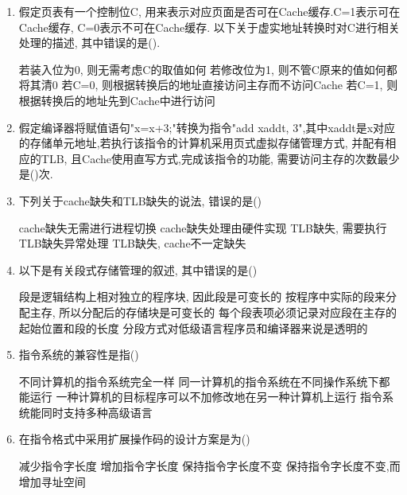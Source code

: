 \documentclass[12pt, a4paper, oneside, UTF8]{ctexbook}
\begin{document}
\begin{enumerate}
    \item 假定页表有一个控制位C, 用来表示对应页面是否可在Cache缓存.C=1表示可在Cache缓存, C=0表示不可在Cache缓存.
    以下关于虚实地址转换时对C进行相关处理的描述, 其中错误的是(\qquad).
    \begin{choices}[1]
        \task 若装入位为0, 则无需考虑C的取值如何
        \task 若修改位为1, 则不管C原来的值如何都将其清0
        \task 若C=0, 则根据转换后的地址直接访问主存而不访问Cache
        \task 若C=1, 则根据转换后的地址先到Cache中进行访问
    \end{choices}

    \item 假定编译器将赋值语句"x=x+3;"转换为指令"add xaddt, 3",其中xaddt是x对应的存储单元地址,若执行该指令的计算机采用页式虚拟存储管理方式,
    并配有相应的TLB, 且Cache使用直写方式,完成该指令的功能, 需要访问主存的次数最少是(\qquad)次.

    \item 下列关于cache缺失和TLB缺失的说法, 错误的是(\qquad)
    \begin{choices}[1]
        \task cache缺失无需进行进程切换
        \task cache缺失处理由硬件实现
        \task TLB缺失, 需要执行TLB缺失异常处理
        \task TLB缺失, cache不一定缺失
    \end{choices}

    \item 以下是有关段式存储管理的叙述, 其中错误的是(\qquad)
    \begin{choices}[1]
        \task 段是逻辑结构上相对独立的程序块, 因此段是可变长的
        \task 按程序中实际的段来分配主存, 所以分配后的存储块是可变长的
        \task 每个段表项必须记录对应段在主存的起始位置和段的长度
        \task 分段方式对低级语言程序员和编译器来说是透明的
    \end{choices}

    \item 指令系统的兼容性是指(\qquad)
    \begin{choices}[1]
    \task 不同计算机的指令系统完全一样
    \task 同一计算机的指令系统在不同操作系统下都能运行
    \task 一种计算机的目标程序可以不加修改地在另一种计算机上运行
    \task 指令系统能同时支持多种高级语言
    \end{choices}

    \item 在指令格式中采用扩展操作码的设计方案是为(\qquad)
    \begin{choices}[1]
    \task 减少指令字长度
    \task 增加指令字长度
    \task 保持指令字长度不变
    \task 保持指令字长度不变,而增加寻址空间
    \end{choices}


\end{enumerate}
\end{document}
